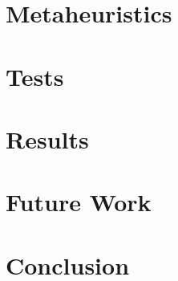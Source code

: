 \documentclass[a4paper,11pt]{article}
\begin{document}
\section{Metaheuristics}
\section{Tests}
\section{Results}
\section{Future Work}
  
\section{Conclusion}
\end{document}
